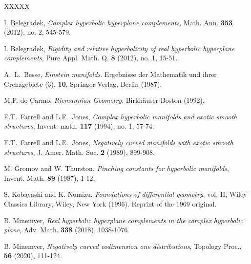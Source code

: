 \documentclass[10pt]{amsart}
\theoremstyle{definition}
\theoremstyle{remark}
\numberwithin{equation}{section}
\begin{document}
\begin{thebibliography}{XXXXX}


 I. Belegradek, \textit{Complex hyperbolic hyperplane complements},
Math. Ann. {\bf 353} (2012), no. 2, 545-579.

 I. Belegradek, \textit{Rigidity and relative hyperbolicity of real hyperbolic hyperplane complements},
Pure Appl. Math. Q. {\bf 8} (2012), no. 1, 15-51.

A.~L.~Besse,
\newblock\emph{Einstein manifolds}.
\newblock Ergebnisse der Mathematik und ihrer Grenzgebiete (3), {\bf 10}, Springer-Verlag, Berlin (1987).

 M.P. do Carmo, \textit{Riemannian Geometry},
Birkh\"auser Boston (1992).

 F.T.\ Farrell and L.E.\ Jones, \textit{Complex hyperbolic manifolds and exotic smooth structures},
Invent. math. {\bf 117} (1994), no. 1, 57-74.

 F.T.\ Farrell and L.E.\ Jones, \textit{Negatively curved manifolds with exotic smooth structures}, J. Amer. Math. Soc. {\bf 2} (1989), 899-908.  


 M. Gromov and W. Thurston, \textit{Pinching constants for hyperbolic manifolds},
Invent. Math. {\bf 89} (1987), 1-12.

 S. Kobayashi and K. Nomizu, \textit{Foundations of differential geometry},
vol. II, Wiley Classics Library, Wiley, New York (1996).  Reprint of the 1969 original.


 B. Minemyer, \textit{Real hyperbolic hyperplane complements in the complex hyperbolic plane},
Adv. Math. {\bf 338} (2018), 1038-1076.  

 B. Minemyer, \textit{Negatively curved codimension one distributions}, Topology Proc., {\bf 56} (2020), 111-124.


\end{thebibliography}
\end{document}
